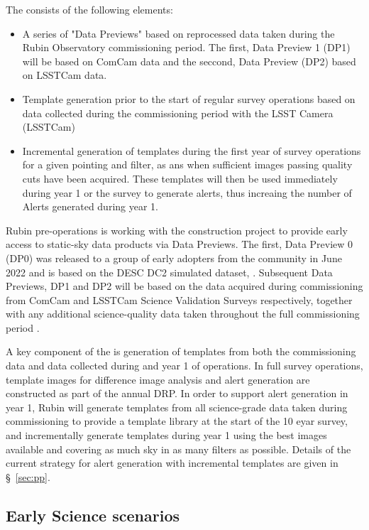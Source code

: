 The \esp consists of the following elements:
\begin{itemize}
	\item A series of "Data Previews" based on reprocessed data taken during the Rubin Observatory commissioning period. The first, Data Preview 1 (DP1) will be based on ComCam data and the seccond, Data Preview (DP2) based on LSSTCam data. 
	\item Template generation prior to the start of regular survey operations based on data collected during the commissioning period with the LSST Camera (LSSTCam)
	\item Incremental generation of templates during the first year of survey operations for a given pointing and filter, as ans when sufficient images passing quality cuts have been acquired. 
	These templates will then be used immediately during year 1 or the survey to generate alerts, thus increaing the number of Alerts generated during year 1. 
\end{itemize}

Rubin pre-operations is working with the construction project to provide early access to static-sky data products via Data Previews. 
The first, Data Preview 0 (DP0) was released to a group of early adopters from the community in June 2022 and is based on the DESC DC2 simulated dataset, \citep{2021ApJS..253...31L}. 
Subsequent Data Previews, DP1 and DP2 will be based on the data acquired during  commissioning from ComCam and LSSTCam Science Validation Surveys respectively, together with any additional science-quality data taken throughout the full commissioning period \citep{RDO-011}.

A key component of the \esp is generation of templates from both the commissioning data and data collected during and year 1 of operations.
In full survey operations, template images for difference image analysis and alert generation are constructed as part of the annual DRP.
In order to support alert generation in year 1, Rubin will generate templates from all science-grade data taken during commissioning to provide a template library at the start of the 10 eyar survey, and incrementally generate templates during year 1 using the best images available and covering as much sky in as many filters as possible.
Details of the current strategy for alert generation  with incremental templates are given in  \S~\ref{sec:pp}.


\subsection{Early Science scenarios } \label{ssec:scenarios}

